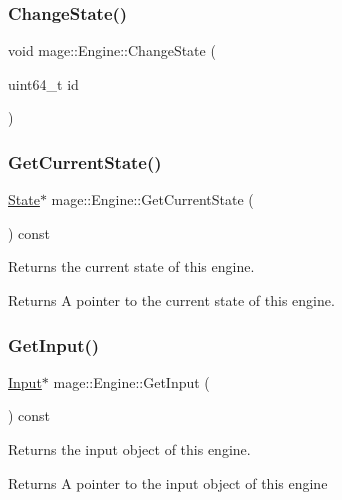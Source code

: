 \subsubsection{\texorpdfstring{Change\+State()}{ChangeState()}}
{\footnotesize\ttfamily void mage\+::\+Engine\+::\+Change\+State (\begin{DoxyParamCaption}\item[{uint64\+\_\+t}]{id }\end{DoxyParamCaption})}

\hypertarget{classmage_1_1_engine_a4750928e48c3ae2e38d10bf8ec0e4816}{}\label{classmage_1_1_engine_a4750928e48c3ae2e38d10bf8ec0e4816} 
\subsubsection{\texorpdfstring{Get\+Current\+State()}{GetCurrentState()}}
{\footnotesize\ttfamily \hyperlink{classmage_1_1_state}{State}$\ast$ mage\+::\+Engine\+::\+Get\+Current\+State (\begin{DoxyParamCaption}{ }\end{DoxyParamCaption}) const}

Returns the current state of this engine.

\begin{DoxyReturn}{Returns}
A pointer to the current state of this engine. 
\end{DoxyReturn}
\hypertarget{classmage_1_1_engine_a55d099d040e8895803f15e214f3b6d9e}{}\label{classmage_1_1_engine_a55d099d040e8895803f15e214f3b6d9e} 
\subsubsection{\texorpdfstring{Get\+Input()}{GetInput()}}
{\footnotesize\ttfamily \hyperlink{classmage_1_1_input}{Input}$\ast$ mage\+::\+Engine\+::\+Get\+Input (\begin{DoxyParamCaption}{ }\end{DoxyParamCaption}) const}

Returns the input object of this engine.

\begin{DoxyReturn}{Returns}
A pointer to the input object of this engine 
\end{DoxyReturn}
\hypertarget{classmage_1_1_engine_a1c5f9d8c68045b36f404251359aa41e4}{}\label{classmage_1_1_engine_a1c5f9d8c68045b36f404251359aa41e4} 

